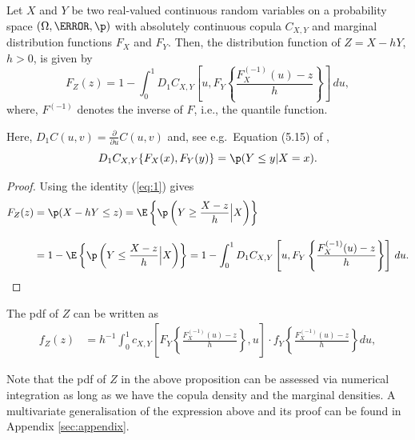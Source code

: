 \begin{proposition}
  \label{prop:dfrh}
  Let $X$ and $Y$ be two real-valued continuous random
  variables on a
  probability space $(\Omega, \F, \p)$ with
  absolutely continuous copula $C_{X, Y}$ and marginal distribution functions $F_{X}$
  and $F_{Y}$. Then, the distribution function of $Z=X-hY$, $h >0$,  is given by
  \begin{equation}
    \label{eq:3}
    F_{Z}(z) = 1- \int^1_0 D_1 C_{X, Y}
    \left[ u, F_{Y} \left\{ \frac{F^{(-1)}_{X}(u)-z}{h} \right\}
    \right]\, d u,   
  \end{equation}
  where, $F^{(-1)}$ denotes the inverse of $F$, i.e., the quantile
function.
\end{proposition}
Here, $D_1 C(u,v)=\displaystyle \frac{\partial}{\partial u}
C(u,v)$ and, see e.g.\ Equation (5.15) of \citet{McNeil2005},
\begin{equation}
  \label{eq:1}
  D_1 C_{X,Y}\{F_X(x), F_Y(y)\} = \p(Y\leq y|X=x).
\end{equation}
\begin{proof}
  Using the identity (\ref{eq:1}) gives
  \begin{align*}
    F_{Z}(z) &= \p(X - h Y\leq z) %
                 = \E\left\{\p\left(Y\geq \frac{X-z}{h}\Big|
                 X\right)\right\}\\[10pt]
               &= 1-\E\left\{\p\left(Y\leq \frac{X-z}{h}\Big|
                 X\right)\right\}%
               = 1- \int_0^1 D_1 C_{X, Y}\left[u,
                 F_{Y}\left\{\frac{F^{(-1)}_{X}(u) -
                 z}{h}\right\}\right]\, d u.
  \end{align*}
  \end{proof}


\begin{corollary} The pdf of $Z$ can be written as
  \begin{align}
  f_{Z}(z) &= h^{-1}\int_0^1 c_{X, Y} \left[
  F_{Y}\left\{\frac{F^{(-1)}_{X}(u)-z}{h}\right\}, u
  \right]
   \cdot
  f_{Y}
  \left\{\frac{F^{(-1)}_{X}(u)-z}{h}\right\} du, \label{eq:density1}
  \end{align}
  \end{corollary}
Note that the pdf of $Z$ in the above proposition can be assessed via numerical integration
as long as we have the copula density and the marginal
densities.
A multivariate generalisation of the expression above and its proof can be found in Appendix \ref{sec:appendix}.


